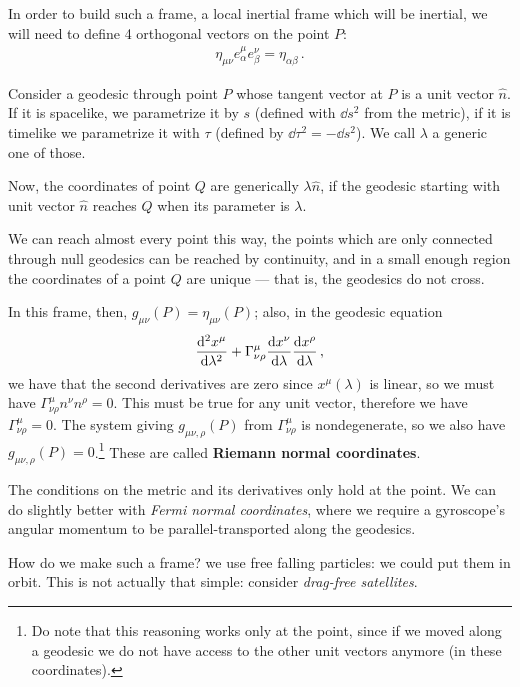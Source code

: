 \documentclass[main.tex]{subfiles}
\begin{document}
In order to build such a frame, a local inertial frame which will be inertial, we will need to define 4 orthogonal vectors on the point \(P\): 
%
\begin{align}
\eta_{\mu \nu } e^{\mu }_{\alpha } e^{\nu }_{\beta } = \eta_{\alpha \beta }
\,.
\end{align}

Consider a geodesic through point \(P\) whose tangent vector at \(P\) is a unit vector \(\hat{n}\). If it is spacelike, we parametrize it by \(s\) (defined with \(\dd{s^2}\) from the metric), if it is timelike we parametrize it with \(\tau\) (defined by \(\dd{\tau^2 } = - \dd{s^2}\)).  We call \(\lambda \) a generic one of those. 

Now, the coordinates of point \(Q\) are generically \(\lambda \hat{n}\), if the geodesic starting with unit vector \(\hat{n}\) reaches \(Q\) when its parameter is \(\lambda \). 

We can reach almost every point this way, the points which are only connected through null geodesics can be reached by continuity, and in a small enough region the coordinates of a point \(Q\) are unique --- that is, the geodesics do not cross. 

In this frame, then, \(g_{\mu \nu } (P) = \eta_{\mu \nu } (P)\); also, in the geodesic equation 
%
\begin{align}
\dv[2]{x^{\mu }}{\lambda } + \Gamma^{\mu }_{ \nu \rho } \dv{x^{\nu }}{\lambda } \dv{x^{\rho }}{\lambda }
\,,
\end{align}
%
we have that the second derivatives are zero since \(x^{\mu}(\lambda )\) is linear, so we must have \(\Gamma^{\mu }_{\nu \rho } n^{\nu } n^{\rho } = 0\). This must be true for any unit vector, therefore we have \(\Gamma^{\mu }_{\nu \rho } =0 \). The system giving \(g_{\mu \nu , \rho } (P) \) from \(\Gamma^{\mu }_{\nu \rho }\) is nondegenerate, so we also have \(g_{\mu \nu , \rho }(P) =0\).\footnote{Do note that this reasoning works only at the point, since if we moved along a geodesic we do not have access to the other unit vectors anymore (in these coordinates).}
These are called \textbf{Riemann normal coordinates}. 

The conditions on the metric and its derivatives only hold at the point. We can do slightly better with \emph{Fermi normal coordinates}, where we require a gyroscope's angular momentum to be parallel-transported along the geodesics. 

How do we make such a frame? we use free falling particles: we could put them in orbit. 
This is not actually that simple: consider \emph{drag-free satellites}. 
\end{document}
